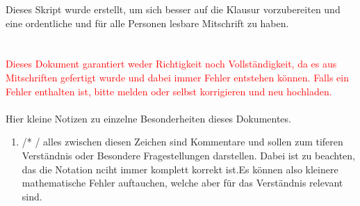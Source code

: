 Dieses Skript wurde erstellt, um sich besser auf die Klausur vorzubereiten und eine ordentliche und für alle Personen lesbare Mitschrift zu haben. \\
\qquad\\
\qquad\\
\textcolor{red}{\Large{Dieses Dokument garantiert weder Richtigkeit noch Vollständigkeit, da es aus Mitschriften gefertigt wurde und dabei immer Fehler entstehen können. Falls ein Fehler enthalten ist, bitte melden oder selbst korrigieren und neu hochladen.}}
\qquad\\
\qquad\\
\large{Hier kleine Notizen zu einzelne Besonderheiten dieses Dokumentes.} \\
\normalsize{
\begin{enumerate}
	\item /* \qquad */  alles zwischen diesen Zeichen sind Kommentare und sollen zum tiferen Verständnis oder Besondere Fragestellungen darstellen. Dabei ist zu beachten, das die Notation nciht immer komplett korrekt ist.Es können also kleinere mathematische Fehler auftauchen, welche aber für das Verständnis relevant sind.
\end{enumerate}
}